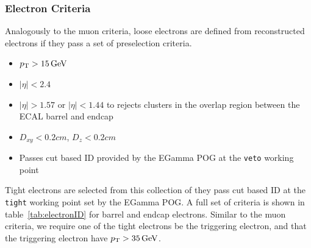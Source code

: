 \subsubsection{Electron Criteria} \label{sec:ana_electrons}
Analogously to the muon criteria, loose electrons are defined from reconstructed electrons if they pass a set of preselection criteria. 
\begin{itemize}
	\item $p_{\mathrm{T}}>15\,\text{Ge\hspace{-.08em}V}$
	\item $|\eta|<2.4$
	\item $|\eta|>1.57\text{ or }|\eta|<1.44$ to rejects clusters in the overlap region between the ECAL barrel and endcap
	\item $D_{xy}<0.2\unit{cm}$, $D_{z}<0.2\unit{cm}$
	\item Passes cut based ID provided by the EGamma POG at the \texttt{veto} working point
\end{itemize}
Tight electrons are selected from this collection of they pass cut based ID at the \texttt{tight} working point set by the EGamma POG. A full set of criteria is shown in table~\ref{tab:electronID} for barrel and endcap electrons. Similar to the muon criteria, we require one of the tight electrons be the triggering electron, and that the triggering electron have $p_{\mathrm{T}}>35\,\text{Ge\hspace{-.08em}V}$.

